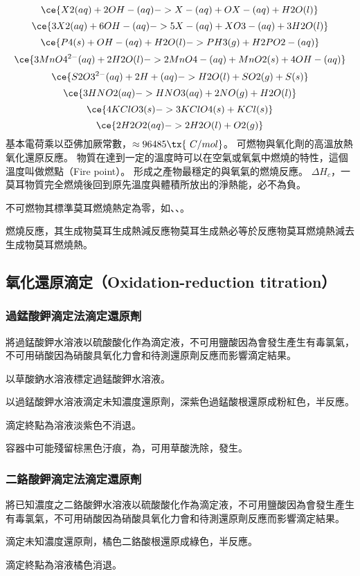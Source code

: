 \documentclass[a4paper,12pt]{article}
\begin{document}
\[\ce{X2(aq) + 2OH-(aq) -> X-(aq) + OX-(aq) + H2O(l)}\]
\[\ce{3X2(aq) + 6OH-(aq) -> 5X-(aq) + XO3-(aq) + 3H2O(l)}\]
\[\ce{P4(s) + OH-(aq) + H2O(l) -> PH3(g) + H2PO2-(aq)}\]
\[\ce{3MnO4^{2-}(aq) + 2H2O(l) -> 2MnO4-(aq) + MnO2(s) + 4OH-(aq)}\]
\[\ce{S2O3^{2-}(aq) + 2H+(aq) -> H2O(l) + SO2(g) + S(s)}\]
\[\ce{3HNO2(aq) -> HNO3(aq) + 2NO(g) + H2O(l)}\]
\[\ce{4KClO3(s) -> 3KClO4(s) + KCl(s)}\]
\[\ce{2H2O2(aq) -> 2H2O(l) + O2(g)}\]
基本電荷乘以亞佛加厥常數，$\approx 96485\tx{\ C/mol}$。
可燃物與氧化劑的高溫放熱氧化還原反應。
物質在達到一定的溫度時可以在空氣或氧氣中燃燒的特性，這個溫度叫做燃點（Fire point）。
形成之產物最穩定的與氧氣的燃燒反應。
$\Delta H_c$，一莫耳物質完全燃燒後回到原先溫度與體積所放出的淨熱能，必不為負。

不可燃物其標準莫耳燃燒熱定為零，如、、。

燃燒反應，其生成物莫耳生成熱減反應物莫耳生成熱必等於反應物莫耳燃燒熱減去生成物莫耳燃燒熱。
\subsection{氧化還原滴定（Oxidation-reduction titration）}
\subsubsection{過錳酸鉀滴定法滴定還原劑}
\ben
\item 將過錳酸鉀水溶液以硫酸酸化作為滴定液，不可用鹽酸因為會發生產生有毒氯氣，不可用硝酸因為硝酸具氧化力會和待測還原劑反應而影響滴定結果。
\item 以草酸鈉水溶液標定過錳酸鉀水溶液。
\item 以過錳酸鉀水溶液滴定未知濃度還原劑，深紫色過錳酸根還原成粉紅色，半反應。
\item 滴定終點為溶液淡紫色不消退。
\item 容器中可能殘留棕黑色汙痕，為，可用草酸洗除，發生。
\een
\subsubsection{二鉻酸鉀滴定法滴定還原劑}
\ben
\item 將已知濃度之二鉻酸鉀水溶液以硫酸酸化作為滴定液，不可用鹽酸因為會發生產生有毒氯氣，不可用硝酸因為硝酸具氧化力會和待測還原劑反應而影響滴定結果。
\item 滴定未知濃度還原劑，橘色二鉻酸根還原成綠色，半反應。
\item 滴定終點為溶液橘色消退。
\een
\end{document}
